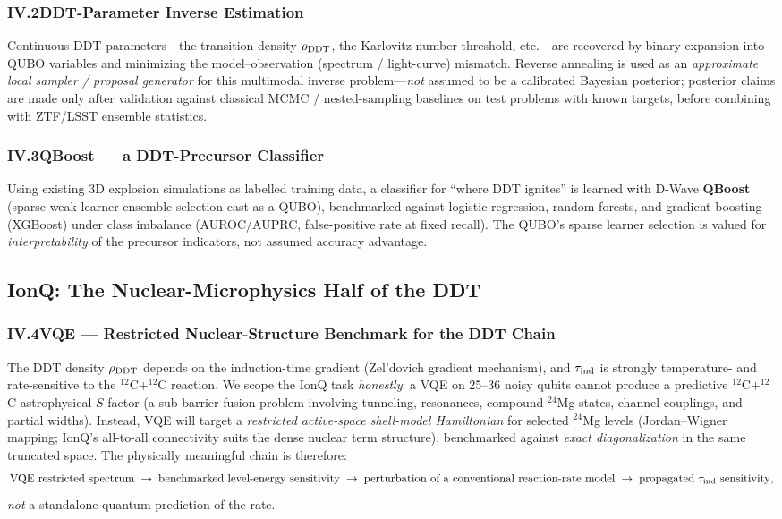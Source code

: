 \documentclass[11pt]{article}
\begin{document}
\subsubsection*{IV.2\quad DDT-Parameter Inverse Estimation}
Continuous DDT parameters---the transition density $\rho_{\rm DDT}$, the Karlovitz-number threshold,
etc.---are recovered by binary expansion into QUBO variables and minimizing the model--observation
(spectrum / light-curve) mismatch. Reverse annealing is used as an \emph{approximate local sampler /
proposal generator} for this multimodal inverse problem---\emph{not} assumed to be a calibrated
Bayesian posterior; posterior claims are made only after validation against classical
MCMC / nested-sampling baselines on test problems with known targets, before combining with ZTF/LSST
ensemble statistics.

\subsubsection*{IV.3\quad QBoost --- a DDT-Precursor Classifier}
Using existing 3D explosion simulations as labelled training data, a classifier for ``where DDT
ignites'' is learned with D-Wave \textbf{QBoost} (sparse weak-learner ensemble selection cast as a
QUBO), benchmarked against logistic regression, random forests, and gradient boosting (XGBoost) under
class imbalance (AUROC/AUPRC, false-positive rate at fixed recall). The QUBO's sparse learner
selection is valued for \emph{interpretability} of the precursor indicators, not assumed accuracy
advantage.

\subsection{IonQ: The Nuclear-Microphysics Half of the DDT}

\subsubsection*{IV.4\quad VQE --- Restricted Nuclear-Structure Benchmark for the DDT Chain}
The DDT density $\rho_{\rm DDT}$ depends on the induction-time gradient (Zel'dovich gradient
mechanism), and $\tau_{\rm ind}$ is strongly temperature- and rate-sensitive to the $^{12}$C$+^{12}$C
reaction. We scope the IonQ task \emph{honestly}: a VQE on 25--36 noisy qubits cannot produce a
predictive $^{12}$C$+^{12}$C astrophysical $S$-factor (a sub-barrier fusion problem involving
tunneling, resonances, compound-$^{24}$Mg states, channel couplings, and partial widths). Instead,
VQE will target a \emph{restricted active-space shell-model Hamiltonian} for selected $^{24}$Mg
levels (Jordan--Wigner mapping; IonQ's all-to-all connectivity suits the dense nuclear term
structure), benchmarked against \emph{exact diagonalization} in the same truncated space. The
physically meaningful chain is therefore:
\[
\text{VQE restricted spectrum} \;\to\; \text{benchmarked level-energy sensitivity}
\;\to\; \text{perturbation of a conventional reaction-rate model} \;\to\; \text{propagated } \tau_{\rm ind}\text{ sensitivity},
\]
\emph{not} a standalone quantum prediction of the rate.
\end{document}
